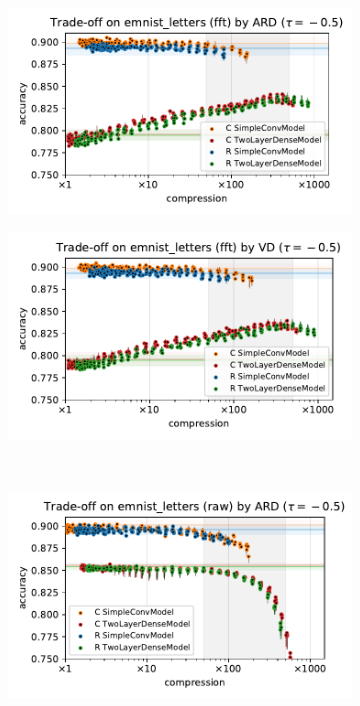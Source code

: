 \documentclass[a4paper,10pt,onecolumn]{article}
\begin{document}
\begin{figure}[b]
\begin{subfigure}[b]{0.5\columnwidth}
    \includegraphics[width=\columnwidth]{figure__mnist-like__trade-off/appendix__ARD__emnist_letters__fft__-0.5.pdf}
  \end{subfigure}%
  \begin{subfigure}[b]{0.5\columnwidth}
    \centering
    \includegraphics[width=\columnwidth]{figure__mnist-like__trade-off/appendix__VD__emnist_letters__fft__-0.5.pdf}
  \end{subfigure} \\ %
  \begin{subfigure}[b]{0.5\columnwidth}
    \centering
    \includegraphics[width=\columnwidth]{figure__mnist-like__trade-off/appendix__ARD__emnist_letters__raw__-0.5.pdf}

\end{subfigure}
\end{figure}
\end{document}
